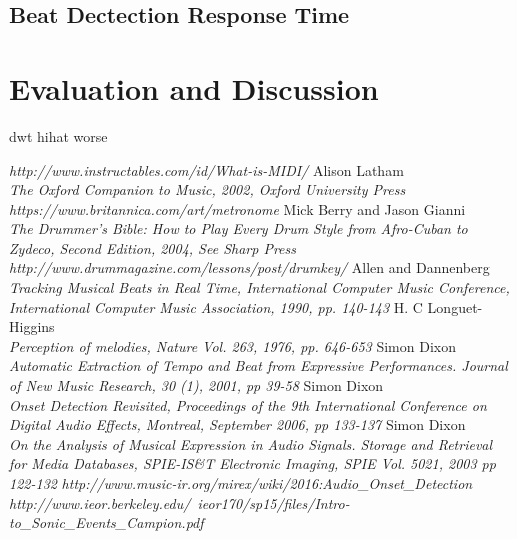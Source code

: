 \documentclass[a4paper, 11pt]{article}
\begin{document}
\subsection{Beat Dectection Response Time}

\maketitle \section{Evaluation and Discussion}

dwt hihat worse

\newpage
\begin{thebibliography}{99}
\textit{http://www.instructables.com/id/What-is-MIDI/}
Alison Latham\\
\textit{The Oxford Companion to Music, 2002, Oxford University Press}
\textit{https://www.britannica.com/art/metronome}
Mick Berry and Jason Gianni\\
\textit{The Drummer's Bible: How to Play Every Drum Style from Afro-Cuban to Zydeco, Second Edition, 2004, See Sharp Press}
\textit{http://www.drummagazine.com/lessons/post/drumkey/}
Allen and Dannenberg\\
\textit{Tracking Musical Beats in Real Time, International Computer Music Conference, International Computer Music Association, 1990, pp. 140-143}
H. C Longuet-Higgins\\
\textit{Perception of melodies, Nature Vol. 263, 1976, pp. 646-653}
Simon Dixon\\
\textit{Automatic Extraction of Tempo and Beat from Expressive Performances. Journal of New Music Research, 30 (1), 2001, pp 39-58}
Simon Dixon\\
\textit{Onset Detection Revisited, Proceedings of the 9th International Conference on Digital Audio Effects, Montreal, September 2006, pp 133-137}
Simon Dixon\\
\textit{On the Analysis of Musical Expression in Audio Signals. Storage and Retrieval for Media Databases, SPIE-IS\&T Electronic Imaging, SPIE Vol. 5021, 2003 pp 122-132}
\textit{http://www.music-ir.org/mirex/wiki/2016:Audio\_Onset\_Detection}
\textit{http://www.ieor.berkeley.edu/~ieor170/sp15/files/Intro-to\_Sonic\_Events\_Campion.pdf}

\end{thebibliography}
\end{document}
